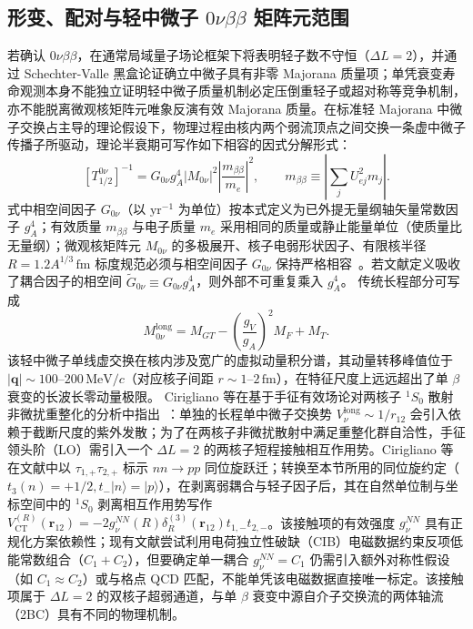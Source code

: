 \subsection{形变、配对与轻中微子 $0\nu\beta\beta$ 矩阵元范围}\label{sec:4-7-3}

若确认 $0\nu\beta\beta$，在通常局域量子场论框架下将表明轻子数不守恒（$\Delta L = 2$），并通过 Schechter-Valle 黑盒论证确立中微子具有非零 Majorana 质量项；单凭衰变寿命观测本身不能独立证明轻中微子质量机制必定压倒重轻子或超对称等竞争机制，亦不能脱离微观核矩阵元唯象反演有效 Majorana 质量。在标准轻 Majorana 中微子交换占主导的理论假设下，物理过程由核内两个弱流顶点之间交换一条虚中微子传播子所驱动，理论半衰期可写作如下相容的因式分解形式：
\begin{equation}\label{eq:4-7-0nubb-halflife}
[T_{1/2}^{0\nu}]^{-1} = G_{0\nu} g_A^4 |M_{0\nu}|^2 \left|\frac{m_{\beta\beta}}{m_e}\right|^2, \qquad m_{\beta\beta} \equiv \left| \sum_j U_{ej}^2 m_j \right|.
\end{equation}
式中相空间因子 $G_{0\nu}$（以 $\mathrm{yr}^{-1}$ 为单位）按本式定义为已外提无量纲轴矢量常数因子 $g_A^4$；有效质量 $m_{\beta\beta}$ 与电子质量 $m_e$ 采用相同的质量或静止能量单位（使质量比无量纲）；微观核矩阵元 $M_{0\nu}$ 的多极展开、核子电弱形状因子、有限核半径 $R = 1.2 A^{1/3}\,\mathrm{fm}$ 标度规范必须与相空间因子 $G_{0\nu}$ 保持严格相容~\cite{engel-menendez-2017-double-beta-matrix-elements-review}。若文献定义吸收了耦合因子的相空间 $\widetilde{G}_{0\nu} \equiv G_{0\nu} g_A^4$，则外部不可重复乘入 $g_A^4$。
传统长程部分可写成
\begin{equation}\label{eq:4-7-NME-decomposition}
M_{0\nu}^{\mathrm{long}}=M_{GT}-\left(\frac{g_V}{g_A}\right)^2M_F+M_T.
\end{equation}
该轻中微子单线虚交换在核内涉及宽广的虚拟动量积分谱，其动量转移峰值位于 $|\mathbf{q}| \sim 100\text{--}200\,\mathrm{MeV}/c$（对应核子间距 $r \sim 1\text{--}2\,\mathrm{fm}$），在特征尺度上远远超出了单 $\beta$ 衰变的长波长零动量极限。
Cirigliano 等在基于手征有效场论对两核子 $^1S_0$ 散射非微扰重整化的分析中指出~\cite{cirigliano-2018-leading-short-range-double-beta}：单独的长程单中微子交换势 $V_\nu^{\mathrm{long}} \sim 1/r_{12}$ 会引入依赖于截断尺度的紫外发散；为了在两核子非微扰散射中满足重整化群自洽性，手征领头阶（LO）需引入一个 $\Delta L = 2$ 的两核子短程接触相互作用势。Cirigliano 等在文献中以 $\tau_{1,+} \tau_{2,+}$ 标示 $n n \to p p$ 同位旋跃迁；转换至本节所用的同位旋约定（$t_3(n) = +1/2, t_- |n\rangle = |p\rangle$），在剥离弱耦合与轻子因子后，其在自然单位制与坐标空间中的 $^1S_0$ 剥离相互作用势写作 $V_{\mathrm{CT}}^{(R)}(\mathbf{r}_{12}) = -2 g_\nu^{NN}(R) \delta_R^{(3)}(\mathbf{r}_{12}) t_{1,-} t_{2,-}$。该接触项的有效强度 $g_\nu^{NN}$ 具有正规化方案依赖性；现有文献尝试利用电荷独立性破缺（CIB）电磁数据约束反项低能常数组合（$C_1 + C_2$），但要确定单一耦合 $g_\nu^{NN} = C_1$ 仍需引入额外对称性假设（如 $C_1 \approx C_2$）或与格点 QCD 匹配，不能单凭该电磁数据直接唯一标定。该接触项属于 $\Delta L = 2$ 的双核子超弱通道，与单 $\beta$ 衰变中源自介子交换流的两体轴流（2BC）具有不同的物理机制。

